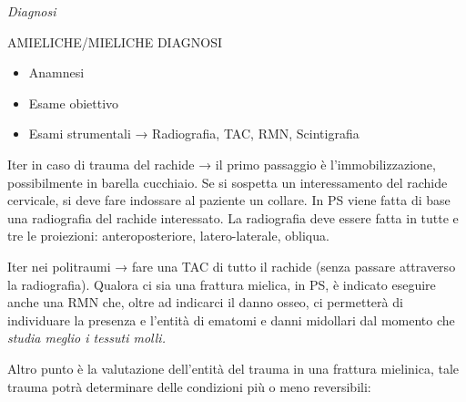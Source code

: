 \documentclass[]{article}
\begin{document}
\emph{Diagnosi}

AMIELICHE/MIELICHE DIAGNOSI

\begin{itemize}
\item
  Anamnesi
\item
  Esame obiettivo
\item
  Esami strumentali → Radiografia, TAC, RMN, Scintigrafia
\end{itemize}

Iter in caso di trauma del rachide → il primo passaggio è
l'immobilizzazione, possibilmente in barella cucchiaio. Se si sospetta
un interessamento del rachide cervicale, si deve fare indossare al
paziente un collare. In PS viene fatta di base una radiografia del
rachide interessato. La radiografia deve essere fatta in tutte e tre le
proiezioni: anteroposteriore, latero-laterale, obliqua.

Iter nei politraumi → fare una TAC di tutto il rachide (senza passare
attraverso la radiografia). Qualora ci sia una frattura mielica, in PS,
è indicato eseguire anche una RMN che, oltre ad indicarci il danno
osseo, ci permetterà di individuare la presenza e l'entità di ematomi e
danni midollari dal momento che \emph{studia meglio i tessuti molli.}

Altro punto è la valutazione dell'entità del trauma in una frattura
mielinica, tale trauma potrà determinare delle condizioni più o meno
reversibili:
\end{document}
